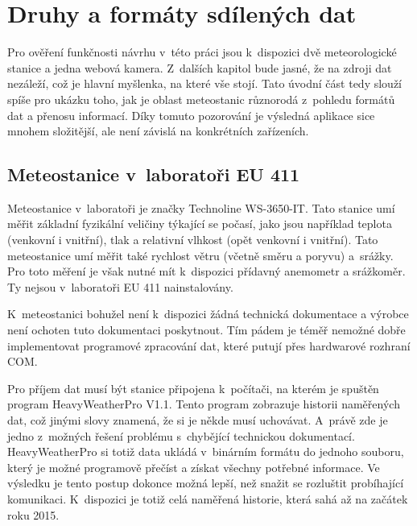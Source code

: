 \chapter{Druhy a formáty sdílených dat}
Pro ověření funkčnosti návrhu v~této práci jsou k~dispozici dvě meteorologické stanice a jedna webová kamera. Z~dalších kapitol bude jasné, že na zdroji dat nezáleží, což je hlavní myšlenka, na které vše stojí. Tato úvodní část tedy slouží spíše pro ukázku toho, jak je oblast meteostanic různorodá z~pohledu formátů dat a přenosu informací. Díky tomuto pozorování je výsledná aplikace sice mnohem složitější, ale není závislá na konkrétních zařízeních.


\section{Meteostanice v~laboratoři EU 411}
Meteostanice v~laboratoři je značky Technoline WS-3650-IT. Tato stanice umí měřit základní fyzikální veličiny týkající se počasí, jako jsou například teplota (venkovní i vnitřní), tlak a relativní vlhkost (opět venkovní i vnitřní). Tato meteostanice umí měřit také rychlost větru (včetně směru a poryvu) a~srážky. Pro toto měření je však nutné mít k~dispozici přídavný anemometr a srážkoměr. Ty nejsou v~laboratoři EU 411 nainstalovány.

K~meteostanici bohužel není k~dispozici žádná technická dokumentace a výrobce není ochoten tuto dokumentaci poskytnout. Tím pádem je téměř nemožné dobře implementovat programové zpracování dat, které putují přes hardwarové rozhraní COM.

Pro příjem dat musí být stanice připojena k~počítači, na kterém je spuštěn program HeavyWeatherPro V1.1. Tento program zobrazuje historii na\-mě\-ře\-ných dat, což jinými slovy znamená, že si je někde musí uchovávat. A~právě zde je jedno z~možných řešení problému s~chybějící technickou dokumentací. HeavyWeatherPro si totiž data ukládá v~binárním formátu do jednoho souboru, který je možné programově přečíst a získat všechny potřebné informace. Ve výsledku je tento postup dokonce možná lepší, než snažit se rozluštit probíhající komunikaci. K~dispozici je totiž celá naměřená historie, která sahá až na začátek roku 2015.

